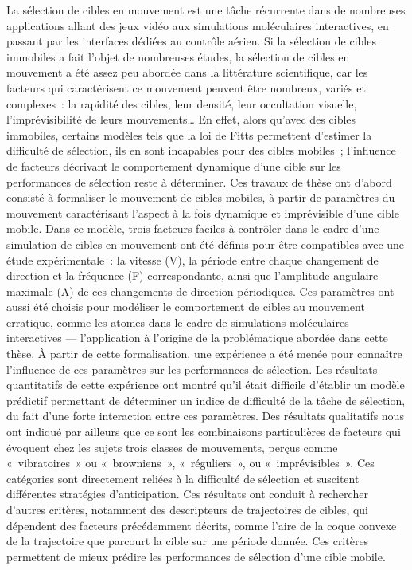 La sélection de cibles en mouvement est une tâche récurrente dans de nombreuses applications allant des jeux vidéo aux simulations moléculaires interactives, en passant par les interfaces dédiées au contrôle aérien. Si la sélection de cibles immobiles a fait l'objet de nombreuses études, la sélection de cibles en mouvement a été assez peu abordée dans la littérature scientifique, car les facteurs qui caractérisent ce mouvement peuvent être nombreux, variés et complexes : la rapidité des cibles, leur densité, leur occultation visuelle, l'imprévisibilité de leurs mouvements\ldots{} En effet, alors qu’avec des cibles immobiles, certains modèles tels que la loi de Fitts permettent d’estimer la difficulté de sélection, ils en sont incapables pour des cibles mobiles ; l'influence de facteurs décrivant le comportement dynamique d'une cible sur les performances de sélection reste à déterminer.
Ces travaux de thèse ont d'abord consisté à formaliser le mouvement de cibles mobiles, à partir de paramètres du mouvement caractérisant l'aspect à la fois dynamique et imprévisible d'une cible mobile. Dans ce modèle, trois facteurs faciles à contrôler dans le cadre d'une simulation de cibles en mouvement ont été définis pour être compatibles avec une étude expérimentale : la vitesse (V), la période entre chaque changement de direction et la fréquence (F) correspondante, ainsi que l'amplitude angulaire maximale (A) de ces changements de direction périodiques. Ces paramètres ont aussi été choisis pour modéliser le comportement de cibles au mouvement erratique, comme les atomes dans le cadre de simulations moléculaires interactives — l’application à l’origine de la problématique abordée dans cette thèse.
À partir de cette formalisation, une expérience a été menée pour connaître l'influence de ces paramètres sur les performances de sélection. Les résultats quantitatifs de cette expérience ont montré qu'il était difficile d'établir un modèle prédictif permettant de déterminer un indice de difficulté de la tâche de sélection, du fait d'une forte interaction entre ces paramètres. Des résultats qualitatifs nous ont indiqué par ailleurs que ce sont les combinaisons particulières de facteurs qui évoquent chez les sujets trois classes de mouvements, perçus comme « vibratoires » ou « browniens », « réguliers », ou « imprévisibles ». Ces catégories sont directement reliées à la difficulté de sélection et suscitent différentes stratégies d'anticipation.
Ces résultats ont conduit à rechercher d'autres critères, notamment des descripteurs de trajectoires de cibles, qui dépendent des facteurs précédemment décrits, comme l'aire de la coque convexe de la trajectoire que parcourt la cible sur une période donnée. Ces critères permettent de mieux prédire les performances de sélection d'une cible mobile.
